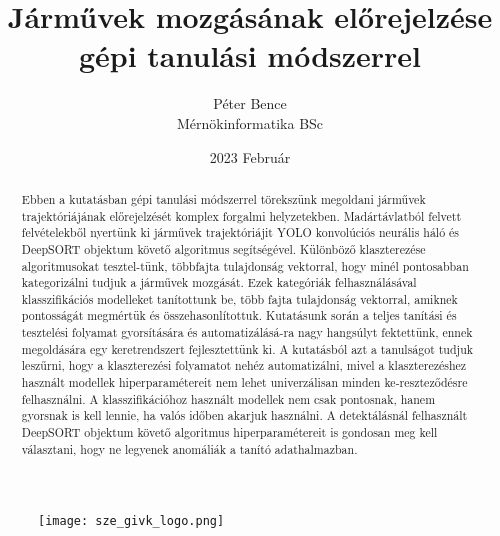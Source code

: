 \documentclass{article}
\title{Járművek mozgásának előrejelzése gépi tanulási módszerrel}
\author{Péter Bence\\Mérnökinformatika BSc}
\date{2023 Február}
\begin{document}
    
    \maketitle
    \begin{figure}[H]\centering
        \texttt{[image: sze\_givk\_logo.png]}
    \end{figure}
    \newpage
    \begin{abstract}
        Ebben a kutatásban gépi tanulási módszerrel törekszünk megoldani
        járművek trajektóriájának előrejelzését komplex forgalmi helyzetekben.
        Madártávlatból felvett felvételekből nyertünk ki járművek trajektóriájit 
        YOLO\cite{wang2022yolov7} konvolúciós neurális háló és DeepSORT\cite{Wojke2018deep} 
        objektum követő algoritmus segítségével. Különböző klaszterezése algoritmusokat 
        tesztel-tünk, többfajta tulajdonság vektorral, hogy minél pontosabban kategorizálni 
        tudjuk a járművek mozgását. Ezek kategóriák felhasználásával klasszifikációs modelleket 
        tanítottunk be, több fajta tulajdonság vektorral, amiknek pontosságát megmértük 
        és összehasonlítottuk. Kutatásunk során a teljes tanítási és tesztelési folyamat 
        gyorsítására és automatizálásá-ra nagy hangsúlyt fektettünk, ennek megoldására egy 
        keretrendszert fejlesztettünk ki. A kutatásból azt a tanulságot tudjuk leszűrni,
        hogy a klaszterezési folyamatot nehéz automatizálni, mivel a klaszterezéshez
        használt modellek hiperparamétereit nem lehet univerzálisan minden ke-reszteződésre 
        felhasználni. A klasszifikációhoz használt modellek nem csak pontosnak,
        hanem gyorsnak is kell lennie, ha valós időben akarjuk használni.
        A detektálásnál felhasznált DeepSORT\cite{Wojke2018deep} objektum követő algoritmus
        hiperparamétereit is gondosan meg kell választani, hogy ne legyenek anomáliák a tanító
        adathalmazban.
    \end{abstract}
    \tableofcontents
    
\end{document}
